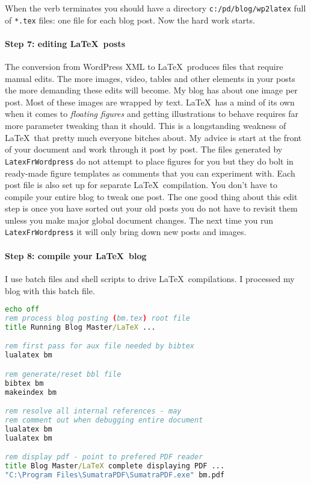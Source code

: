When the verb terminates you should have a directory
\texttt{c:/pd/blog/wp2latex} full of \texttt{*.tex} files: one file for
each blog post. Now the hard work starts.

\paragraph{Step 7: editing \LaTeX\ posts}

The conversion from WordPress XML to \LaTeX\ produces files that require
manual edits. The more images, video, tables and other elements in your
posts the more demanding these edits will become. My blog has about one
image per post. Most of these images are wrapped by text. \LaTeX\ has a
mind of its own when it comes to \emph{floating figures} and getting
illustrations to behave requires far more parameter tweaking than it
should. This is a longstanding weakness of \LaTeX\ that pretty much
everyone bitches about. My advice is start at the front of your document
and work through it post by post. The files generated by
\texttt{LatexFrWordpress} do not attempt to place figures for you but
they do bolt in ready-made figure templates as comments that you can
experiment with. Each post file is also set up for separate \LaTeX\
compilation. You don't have to compile your entire blog to tweak one
post. The one good thing about this edit step is once you have sorted
out your old posts you do not have to revisit them unless you make major
global document changes. The next time you run \texttt{LatexFrWordpress}
it will only bring down new posts and images.

\paragraph{Step 8: compile your \LaTeX\ blog}

I use batch files and shell scripts to drive \LaTeX\ compilations. I
processed my blog with this batch file.

\begin{tcolorbox}[breakable, size=fbox, boxrule=1pt, pad at break*=1mm,colback=cellbackground, colframe=cellborder]
\begin{lstlisting}[language=bat,frame=single,framerule=0pt,label=lst:scr2518X2]
echo off
rem process blog posting (bm.tex) root file
title Running Blog Master/LaTeX ...

rem first pass for aux file needed by bibtex
lualatex bm

rem generate/reset bbl file
bibtex bm
makeindex bm

rem resolve all internal references - may
rem comment out when debugging entire document
lualatex bm
lualatex bm

rem display pdf - point to prefered PDF reader
title Blog Master/LaTeX complete displaying PDF ...
"C:\Program Files\SumatraPDF\SumatraPDF.exe" bm.pdf
\end{lstlisting}
\end{tcolorbox}

